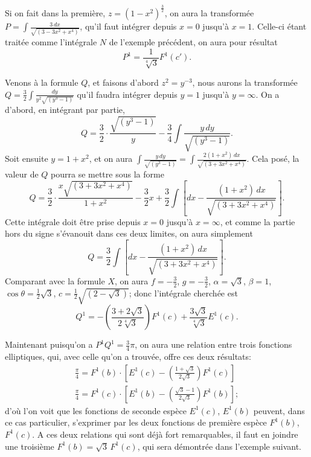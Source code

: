 \documentclass{article}
\begin{document}
Si on fait dans la première, $z=(1-x^{2})^{\frac{3}{2}}$, on aura la transformée $P=\displaystyle\int\frac{3\,dx}{\sqrt{(3-3x^{2}+x^{4})}}$, qu'il faut intégrer depuis $x=0$ jusqu'à $x=1$. Celle-ci étant traitée comme l'intégrale $N$ de l'exemple précédent, on aura pour résultat
\[ P^{1}=\frac{1}{\sqrt[4]{3}}F^{1}(c'). \]

Venons à la formule $Q$, et faisons d'abord $z^{2}=y^{-3}$, nous aurons la transformée $Q=\frac{3}{2}\displaystyle\int\frac{dy}{y^{2}\sqrt{(y^{3}-1)}}$ qu'il faudra intégrer depuis $y=1$ jusqu'à $y=\infty$. On a d'abord, en intégrant par partie,
\[ Q=\frac{3}{2}\cdot\frac{\sqrt{(y^{3}-1)}}{y}-\frac{3}{4}\int\frac{y\,dy}{\sqrt{(y^{3}-1)}}. \]
Soit ensuite $y=1+x^{2}$, et on aura $\displaystyle\int\frac{y\,dy}{\sqrt{(y^{3}-1)}}=\displaystyle\int\frac{2(1+x^{2})\,dx}{\sqrt{(3+3x^{2}+x^{4})}}$. Cela posé, la valeur de $Q$ pourra se mettre sous la forme
\[ Q=\frac{3}{2}\cdot\frac{x\sqrt{(3+3x^{2}+x^{4})}}{1+x^{2}}-\frac{3}{2}x+\frac{3}{2}\int\left[dx-\frac{(1+x^{2})\,dx}{\sqrt{(3+3x^{2}+x^{4})}}\right]. \]
Cette intégrale doit être prise depuis $x=0$ jusqu'à $x=\infty$, et comme la partie hors du signe s'évanouit dans ces deux limites, on aura simplement
\[ Q=\frac{3}{2}\int\left[dx-\frac{(1+x^{2})\,dx}{\sqrt{(3+3x^{2}+x^{4})}}\right]. \]
Comparant avec la formule $X$, on aura $f=-\frac{3}{2}$, $g=-\frac{3}{2}$, $\alpha=\sqrt{3}$, $\beta=1$, $\cos\theta=\frac{1}{2}\sqrt{3}$, $c=\frac{1}{2}\sqrt{(2-\sqrt{3})}$; donc l'intégrale cherchée est
\[ Q^{1}=-\left(\frac{3+2\sqrt{3}}{2\sqrt[4]{3}}\right)F^{1}(c)+\frac{3\sqrt{3}}{\sqrt[4]{3}}E^{1}(c). \]

Maintenant puisqu'on a $P^{1}Q^{1}=\frac{3}{4}\pi$, on aura une relation entre trois fonctions elliptiques, qui, avec celle qu'on a trouvée, offre ces deux résultats:
\[ \begin{gathered} \frac{\pi}{4}=F^{1}(b)\cdot\left[E^{1}(c)-\left(\frac{1+\sqrt{3}}{2\sqrt{3}}\right)F^{1}(c)\right]\\ \frac{\pi}{4}=F^{1}(c)\cdot\left[E^{1}(b)-\left(\frac{\sqrt{3}-1}{2\sqrt{3}}\right)F^{1}(b)\right]; \end{gathered} \]
d'où l'on voit que les fonctions de seconde espèce $E^{1}(c)$, $E^{1}(b)$ peuvent, dans ce cas particulier, s'exprimer par les deux fonctions de première espèce $F^{1}(b)$, $F^{1}(c)$. A ces deux relations qui sont déjà fort remarquables, il faut en joindre une troisième $F^{1}(b)=\sqrt{3}\,F^{1}(c)$, qui sera démontrée dans l'exemple suivant.
\end{document}
